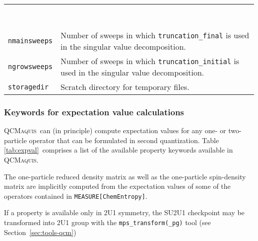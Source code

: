 \documentclass[bibliography=totoc,12pt,a4paper]{scrartcl}
\newcommand{\qcm}{\textsc{QCMaquis}}
\newcommand{\tableoptionskip}{0.3em}
\begin{document}
\begin{longtable}{ll}
& \\
& \\
& \\
& \\
& \\
& \\
& \\
& \\[\tableoptionskip]
\multirow{2}{*}{\texttt{nmainsweeps}} & \multirow{2}{11cm}{Number of sweeps in which \texttt{truncation\_final} is used in the singular value decomposition.} \\
& \\[\tableoptionskip]
\multirow{2}{*}{\texttt{ngrowsweeps}} &\multirow{2}{11cm}{Number of sweeps in which \texttt{truncation\_initial} is used in the singular value decomposition.}\\
& \\[\tableoptionskip]
\texttt{storagedir} &Scratch directory for temporary files.\\
\bottomrule
\end{longtable}

\subsubsection{Keywords for expectation value calculations}\label{sec:prop-qcm}

\qcm\ can (in principle) compute expectation values for any one- or two-particle operator that can be formulated in
second quantization. Table \ref{tab:expval}\ comprises a list of the available property keywords available in \qcm.

The one-particle reduced density matrix as well as the one-particle spin-density matrix are implicitly computed from the
expectation values of some of the operators contained in \texttt{MEASURE[ChemEntropy]}.

If a property is available only in 2U1 symmetry, the SU2U1 checkpoint may be transformed into 2U1 group with the \texttt{mps\_transform(\_pg)} tool (see Section~\ref{sec:tools-qcm})
\end{document}
